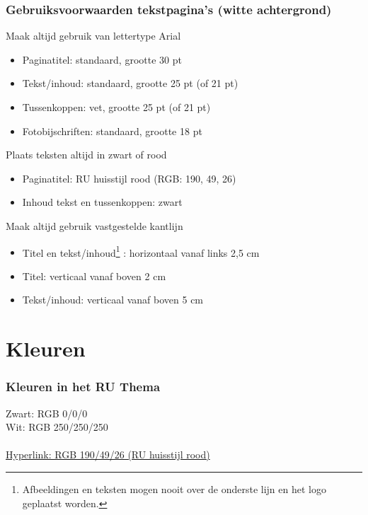 \documentclass[showdate=true, slidenumbers=slide]{beamerruhuisstijl169}
\begin{document}
\begin{frame}
    \frametitle{Gebruiksvoorwaarden tekstpagina's (witte achtergrond)}

    \begin{block}{Maak altijd gebruik van lettertype Arial}
        \begin{itemize}
            \item Paginatitel: standaard, grootte 30 pt
            \item Tekst/inhoud: standaard, grootte 25 pt (of 21 pt)
            \item Tussenkoppen: vet, grootte 25 pt (of 21 pt)
            \item Fotobijschriften: standaard, grootte 18 pt
        \end{itemize}
    \end{block}

    \begin{block}{Plaats teksten altijd in zwart of rood}
        \begin{itemize}
            \item Paginatitel: RU huisstijl rood {\color{ruhuisstijlrood} (RGB: 190, 49, 26)}
            \item Inhoud tekst en tussenkoppen: zwart
        \end{itemize}
    \end{block}

    \begin{block}{Maak altijd gebruik vastgestelde kantlijn}
        \begin{itemize}
            \item Titel en tekst/inhoud\footnote{Afbeeldingen en teksten mogen nooit over de onderste lijn en het logo geplaatst worden.}
            : horizontaal vanaf links 2,5 cm
            \item Titel: verticaal vanaf boven 2 cm
            \item Tekst/inhoud: verticaal vanaf boven 5 cm
        \end{itemize}
    \end{block}

\end{frame}

\section{Kleuren}
\begin{frame}
    \frametitle{Kleuren in het RU Thema}

    Zwart: RGB 0/0/0 \\
    Wit: RGB 250/250/250 \\
     \\
    \href{http://google.com/}{Hyperlink: RGB 190/49/26 (RU huisstijl rood)}
\end{frame}
\end{document}
